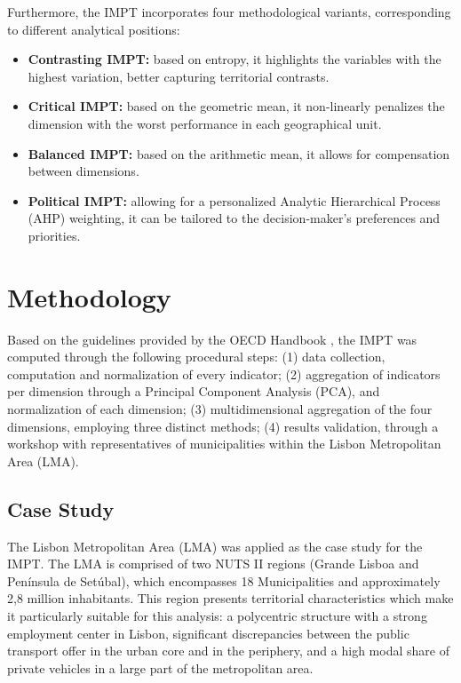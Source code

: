\documentclass[
  authoryear,
  review,
  1p]{elsarticle}
\providecommand{\tightlist}{%
  \setlength{\itemsep}{0pt}\setlength{\parskip}{0pt}}
\begin{document}
Furthermore, the IMPT incorporates four methodological variants,
corresponding to different analytical positions:

\begin{itemize}
\tightlist
\item
  \textbf{Contrasting IMPT:} based on entropy, it highlights the
  variables with the highest variation, better capturing territorial
  contrasts.
\item
  \textbf{Critical IMPT:} based on the geometric mean, it non-linearly
  penalizes the dimension with the worst performance in each
  geographical unit.
\item
  \textbf{Balanced IMPT:} based on the arithmetic mean, it allows for
  compensation between dimensions.
\item
  \textbf{Political IMPT:} allowing for a personalized Analytic
  Hierarchical Process (AHP) weighting, it can be tailored to the
  decision-maker's preferences and priorities.
\end{itemize}

\section{Methodology}\label{sec-methodology}

Based on the guidelines provided by the OECD Handbook
\citep{OECD_EU_2008}, the IMPT was computed through the following
procedural steps: (1) data collection, computation and normalization of
every indicator; (2) aggregation of indicators per dimension through a
Principal Component Analysis (PCA), and normalization of each dimension;
(3) multidimensional aggregation of the four dimensions, employing three
distinct methods; (4) results validation, through a workshop with
representatives of municipalities within the Lisbon Metropolitan Area
(LMA).

\subsection{Case Study}\label{sec-MET_case_study}

The Lisbon Metropolitan Area (LMA) was applied as the case study for the
IMPT. The LMA is comprised of two NUTS II regions (Grande Lisboa and
Península de Setúbal), which encompasses 18 Municipalities and
approximately 2,8 million inhabitants. This region presents territorial
characteristics which make it particularly suitable for this analysis: a
polycentric structure with a strong employment center in Lisbon,
significant discrepancies between the public transport offer in the
urban core and in the periphery, and a high modal share of private
vehicles in a large part of the metropolitan area.
\end{document}
